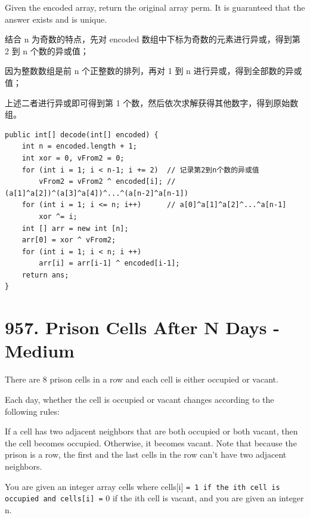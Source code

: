 \documentclass[9pt, b5paaper]{book}
\begin{document}
Given the encoded array, return the original array perm. It is guaranteed that the answer exists and is unique.

结合 n 为奇数的特点，先对 encoded 数组中下标为奇数的元素进行异或，得到第 2 到 n 个数的异或值；

因为整数数组是前 n 个正整数的排列，再对 1 到 n 进行异或，得到全部数的异或值；

上述二者进行异或即可得到第 1 个数，然后依次求解获得其他数字，得到原始数组。
\begin{verbatim}
public int[] decode(int[] encoded) {
    int n = encoded.length + 1;
    int xor = 0, vFrom2 = 0;
    for (int i = 1; i < n-1; i += 2)  // 记录第2到n个数的异或值
        vFrom2 = vFrom2 ^ encoded[i]; // (a[1]^a[2])^(a[3]^a[4])^...^(a[n-2]^a[n-1])
    for (int i = 1; i <= n; i++)      // a[0]^a[1]^a[2]^...^a[n-1]
        xor ^= i;
    int [] arr = new int [n];
    arr[0] = xor ^ vFrom2;
    for (int i = 1; i < n; i ++)
        arr[i] = arr[i-1] ^ encoded[i-1];
    return ans;
}
\end{verbatim}

\section{957. Prison Cells After N Days - Medium}
\label{sec-10-12}
There are 8 prison cells in a row and each cell is either occupied or vacant.

Each day, whether the cell is occupied or vacant changes according to the following rules:

If a cell has two adjacent neighbors that are both occupied or both vacant, then the cell becomes occupied.
Otherwise, it becomes vacant.
Note that because the prison is a row, the first and the last cells in the row can't have two adjacent neighbors.

You are given an integer array cells where cells[i] \texttt{= 1 if the ith cell is occupied and cells[i] =} 0 if the ith cell is vacant, and you are given an integer n.
\end{document}
